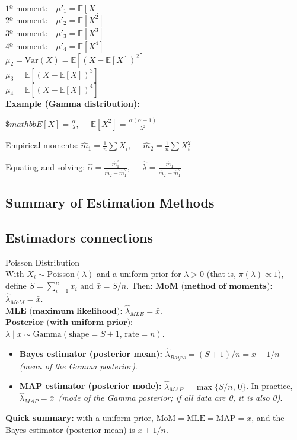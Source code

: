 $\text{1º moment:} \quad \mu'_1 = \mathbb{E}[X]$ \\
$\text{2º moment:} \quad \mu'_2 = \mathbb{E}[X^2]$ \\
$\text{3º moment:} \quad \mu'_3 = \mathbb{E}[X^3]$ \\
$\text{4º moment:} \quad \mu'_4 = \mathbb{E}[X^4]$ \\

$\mu_2 = \mathrm{Var}(X) = \mathbb{E}[(X - \mathbb{E}[X])^2]$ \\
$\mu_3 = \mathbb{E}[(X - \mathbb{E}[X])^3]$ \\
$\mu_4 = \mathbb{E}[(X - \mathbb{E}[X])^4]$ \\


\noindent \textbf{Example (Gamma distribution):}

$\$mathbb{E}[X] = \frac{\alpha}{\lambda}, \quad$
$\mathbb{E}[X^2] = \frac{\alpha(\alpha+1)}{\lambda^2}$

Empirical moments:
$\hat{m}_1 = \frac{1}{n}\sum X_i, \quad$
$\hat{m}_2 = \frac{1}{n}\sum X_i^2$

Equating and solving:
$\hat{\alpha} = \frac{\hat{m}_1^2}{\hat{m}_2 - \hat{m}_1^2}, 
\quad$
$\hat{\lambda} = \frac{\hat{m}_1}{\hat{m}_2 - \hat{m}_1^2}$

\subsection*{Summary of Estimation Methods}

\subsection*{Estimadors connections}
Poisson Distribution\\
With $X_i \sim \text{Poisson}(\lambda)$ and a uniform prior for $\lambda > 0$ (that is, $\pi(\lambda) \propto 1$), define 
$S = \sum_{i=1}^n x_i$ and $\bar{x} = S / n$. Then:
$\textbf{MoM (method of moments):}$
$\hat{\lambda}_{MoM} = \bar{x}$.\\
$\textbf{MLE (maximum likelihood):}$
$\hat{\lambda}_{MLE} = \bar{x}$.\\
$\textbf{Posterior (with uniform prior):}$\\
$\lambda\mid x\sim\text{Gamma}(\text{shape}=S+1,\,\text{rate}=n)$.\\
\begin{itemize}
    \item \textbf{Bayes estimator (posterior mean):} 
    $\hat{\lambda}_{Bayes} = (S + 1)/n = \bar{x} + 1/n$ \,\,\textit{(mean of the Gamma posterior)}.
    \item \textbf{MAP estimator (posterior mode):} 
    $\hat{\lambda}_{MAP} = \max\{S/n,\,0\}$.
    In practice, $\hat{\lambda}_{MAP} = \bar{x}$ \,\textit{(mode of the Gamma posterior; if all data are 0, it is also 0)}.
\end{itemize}
\textbf{Quick summary:} with a uniform prior, $\text{MoM} = \text{MLE} = \text{MAP} = \bar{x}$, and the Bayes estimator (posterior mean) is $\bar{x} + 1/n$.\\


